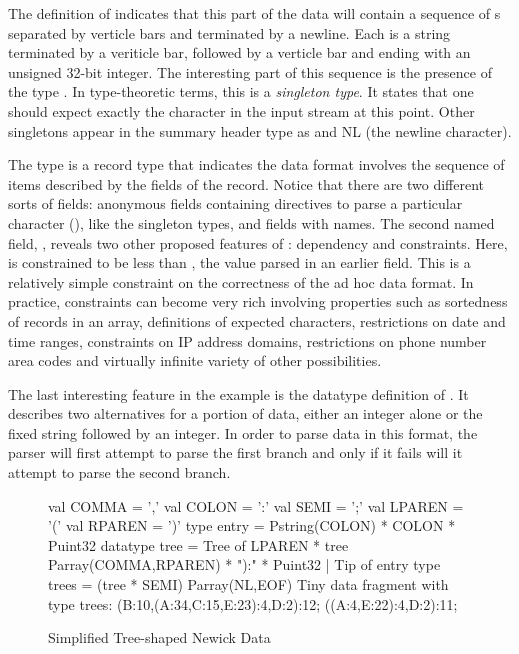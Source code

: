 \documentclass[11pt]{article}
\begin{document}
% 



The definition of  indicates that
this part of the \dibbler{} data will contain a sequence
of s separated by verticle bars and terminated by a newline.
Each  is a string terminated by a veriticle bar,
followed by a verticle bar and ending with an unsigned
32-bit integer.  The interesting part of this sequence is the
presence of the type .  In type-theoretic terms, this is
a {\em singleton type}.  It states that one should
 expect exactly the character  in the input stream at this point.
Other singletons appear in the summary header type as 
and NL (the newline character).

The type  is a record type that indicates
the data format involves the sequence of items described by
the fields of the record.  Notice that there are two different
sorts of fields: anonymous fields containing directives to parse
a particular character (), like the singleton types,
and fields with names.  The second named field,
, reveals two other proposed features of 
\datatype: dependency and constraints.  Here,
 is constrained to be less than
, the value parsed in an earlier field.
This is a relatively simple constraint on the correctness of the
ad hoc data format.  In practice, constraints can become very rich
involving properties such as sortedness of records in an array,
definitions of expected characters,
restrictions on date and time ranges, constraints on IP address
domains, restrictions on phone number area codes and virtually 
infinite variety of other possibilities. 

The last interesting feature in the \dibbler{} example is the
datatype definition of .  It describes
two alternatives for a portion of data, either an integer alone
or the fixed string  followed by an integer.
In order to parse data in this format, the parser will
first attempt to parse the first branch and only if it
fails will it attempt to parse the second branch.

\begin{figure}
\begin{code}
val COMMA  = ','
val COLON  = ':'
val SEMI   = ';'
val LPAREN = '('
val RPAREN = ')'
\mbox{}
type entry = Pstring(COLON) * COLON * Puint32
\mbox{}
datatype tree =
    Tree of LPAREN * tree Parray(COMMA,RPAREN) * "):" * Puint32
  | Tip of entry
\mbox{}
type trees = (tree * SEMI) Parray(NL,EOF)
\mbox{}
{\rm Tiny data fragment with type trees: }
\mbox{}
(B:10,(A:34,C:15,E:23):4,D:2):12;
((A:4,E:22):4,D:2):11;
\end{code}
\caption{Simplified Tree-shaped Newick Data}
\label{figure:newick}
\end{figure}
\end{document}
